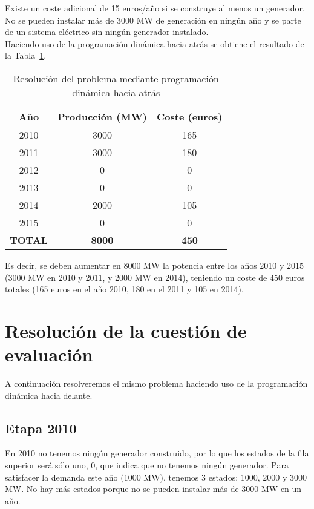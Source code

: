 \documentclass[12pt,a4paper,twoside,openright,titlepage,final]{article}
\begin{document}
Existe un coste adicional de 15 euros/año si se construye al menos un generador. No se pueden instalar más de 3000 MW de generación en ningún año y se parte de un sistema eléctrico sin ningún generador instalado.\\

Haciendo uso de la programación dinámica hacia atrás se obtiene el resultado de la Tabla~\ref{tbl:resolucion_hacia_atras}.\\


\begin{table}[htbp!]
\centering
\caption{Resolución del problema mediante programación dinámica hacia atrás}
\label{tbl:resolucion_hacia_atras}
\begin{tabular}{@{}ccc@{}}
\toprule
Año            & Producción (MW) & Coste (euros) \\ \midrule
2010           & 3000            & 165           \\
2011           & 3000            & 180           \\
2012           & 0               & 0             \\
2013           & 0               & 0             \\
2014           & 2000            & 105           \\
2015           & 0               & 0             \\
\textbf{TOTAL} & \textbf{8000}   & \textbf{450}  \\ \bottomrule
\end{tabular}
\end{table}

Es decir, se deben aumentar en 8000 MW la potencia entre los años 2010 y 2015 (3000 MW en 2010 y 2011, y 2000 MW en 2014), teniendo un coste de 450 euros totales (165 euros en el año 2010, 180 en el 2011 y 105 en 2014).

\section{Resolución de la cuestión de evaluación}

A continuación resolveremos el mismo problema haciendo uso de la programación dinámica hacia delante.

\subsection{Etapa 2010}

En 2010 no tenemos ningún generador construido, por lo que los estados de la fila superior será sólo uno, 0, que indica que no tenemos ningún generador. Para satisfacer la demanda este año (1000 MW), tenemos 3 estados: 1000, 2000 y 3000 MW. No hay más estados porque no se pueden instalar más de 3000 MW en un año.\\
\end{document}
